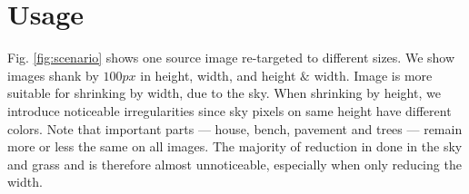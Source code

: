 \documentclass[a4paper,11pt]{article}
\begin{document}
\section{Usage}
Fig. \ref{fig:scenario} shows one source image re-targeted to different sizes.
We show images shank by $100px$ in height, width, and height $\&$ width.
Image is more suitable for shrinking by width, due to the sky.
When shrinking by height, we introduce noticeable irregularities since sky pixels on same height have different colors. Note that important parts — house, bench, pavement and trees — remain more or less the same on all images. The majority of reduction in done in the sky and grass and is therefore almost unnoticeable, especially when only reducing the width.

\begin{figure}[h!]
\begin{minipage}[b]{0.48\linewidth}
\setlength\fboxsep{5pt}
\setlength\fboxrule{0pt}
\centering
{}


\end{minipage}
\end{figure}
\end{document}

